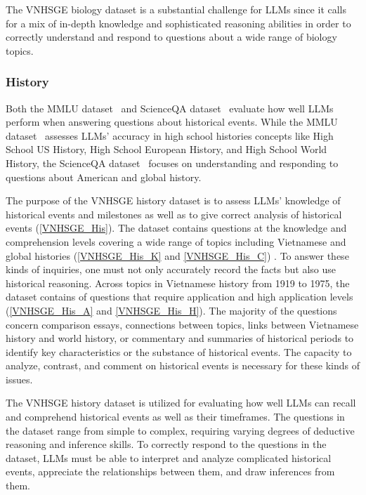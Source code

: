 \documentclass{article}
\begin{document}
{	The VNHSGE biology dataset is a substantial challenge for LLMs since it calls for a mix of in-depth knowledge and sophisticated reasoning abilities in order to correctly understand and respond to questions about a wide range of biology topics.
	
	\subsubsection{History}
	
	Both the MMLU dataset~\cite{hendrycks2020measuring} and ScienceQA dataset~\cite{lu2022learn} evaluate how well LLMs perform when answering questions about historical events. While the MMLU dataset~\cite{hendrycks2020measuring} assesses LLMs' accuracy in high school histories concepts like High School US History, High School European History, and High School World History, the ScienceQA dataset~\cite{lu2022learn} focuses on understanding and responding to questions about American and global history.
	
	The purpose of the VNHSGE history dataset is to assess LLMs' knowledge of historical events and milestones as well as to give correct analysis of historical events (\ref{VNHSGE_His}). The dataset contains  questions at the knowledge and comprehension levels covering a wide range of topics including Vietnamese and global histories (\ref{VNHSGE_His_K} and \ref{VNHSGE_His_C}) . To answer these kinds of inquiries, one must not only accurately record the facts but also use historical reasoning. Across topics in Vietnamese history from 1919 to 1975, the dataset contains  of questions that require application and high application levels (\ref{VNHSGE_His_A} and \ref{VNHSGE_His_H}). The majority of the questions concern comparison essays, connections between topics, links between Vietnamese history and world history, or commentary and summaries of historical periods to identify key characteristics or the substance of historical events. The capacity to analyze, contrast, and comment on historical events is necessary for these kinds of issues.
	
	The VNHSGE history dataset is utilized for evaluating how well LLMs can recall and comprehend historical events as well as their timeframes. The questions in the dataset range from simple to complex, requiring varying degrees of deductive reasoning and inference skills. To correctly respond to the questions in the dataset, LLMs must be able to interpret and analyze complicated historical events, appreciate the relationships between them, and draw inferences from them.
	
}
\end{document}
